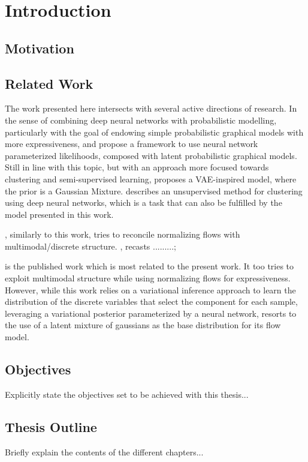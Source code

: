 \chapter{Introduction}
\label{chapter:introduction}

\section{Motivation}
\label{section:motivation}

\section{Related Work}
\label{section:related}

The work presented here intersects with several active directions of research.
In the sense of combining deep neural networks with probabilistic modelling,
particularly with the goal of endowing simple probabilistic graphical models
with more expressiveness, \cite{svae} and \cite{lin2018variational} propose a
framework to use neural network parameterized likelihoods, composed with latent
probabilistic graphical models. Still in line with this topic, but with an
approach more focused towards clustering and semi-supervised learning, \cite{gmVAE}
proposes a VAE-inspired model, where the prior is a Gaussian Mixture. \cite{DEC}
describes an unsupervised method for clustering using deep neural networks, which
is a task that can also be fulfilled by the model presented in this work.

\cite{RAD}, similarly to this work, tries to reconcile normalizing flows with
multimodal/discrete structure. , \cite{RAD} recasts .........;

\cite{semisuplearning_nflows} is the published work which is most related to the
present work. It too tries to exploit multimodal structure while using normalizing
flows for expressiveness. However, while this work relies on a variational inference
approach to learn the distribution of the discrete variables that select the
component for each sample, leveraging a variational posterior parameterized by
a neural network, \cite{semisuplearning_nflows} resorts to the use of a latent
mixture of gaussians as the base distribution for its flow model.


\section{Objectives}
\label{section:objectives}

Explicitly state the objectives set to be achieved with this thesis...

\section{Thesis Outline}
\label{section:outline}

Briefly explain the contents of the different chapters...

